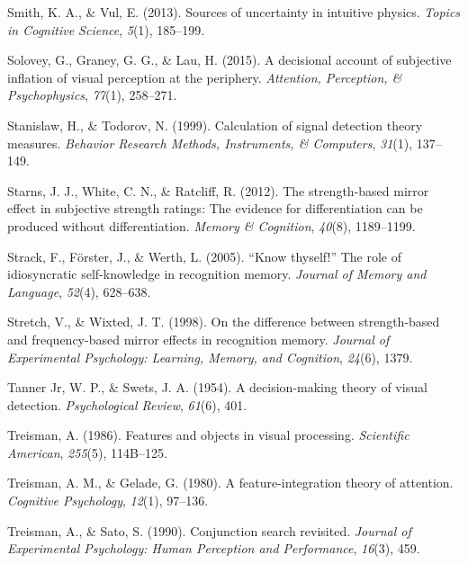 \documentclass[12pt,twoside]{reedthesis}
\begin{document}
\leavevmode\hypertarget{ref-smith2013sources}{}%
Smith, K. A., \& Vul, E. (2013). Sources of uncertainty in intuitive physics. \emph{Topics in Cognitive Science}, \emph{5}(1), 185--199.

\leavevmode\hypertarget{ref-solovey2015decisional}{}%
Solovey, G., Graney, G. G., \& Lau, H. (2015). A decisional account of subjective inflation of visual perception at the periphery. \emph{Attention, Perception, \& Psychophysics}, \emph{77}(1), 258--271.

\leavevmode\hypertarget{ref-stanislaw1999calculation}{}%
Stanislaw, H., \& Todorov, N. (1999). Calculation of signal detection theory measures. \emph{Behavior Research Methods, Instruments, \& Computers}, \emph{31}(1), 137--149.

\leavevmode\hypertarget{ref-starns2012strength}{}%
Starns, J. J., White, C. N., \& Ratcliff, R. (2012). The strength-based mirror effect in subjective strength ratings: The evidence for differentiation can be produced without differentiation. \emph{Memory \& Cognition}, \emph{40}(8), 1189--1199.

\leavevmode\hypertarget{ref-strack2005know}{}%
Strack, F., Förster, J., \& Werth, L. (2005). ``Know thyself!'' The role of idiosyncratic self-knowledge in recognition memory. \emph{Journal of Memory and Language}, \emph{52}(4), 628--638.

\leavevmode\hypertarget{ref-stretch1998difference}{}%
Stretch, V., \& Wixted, J. T. (1998). On the difference between strength-based and frequency-based mirror effects in recognition memory. \emph{Journal of Experimental Psychology: Learning, Memory, and Cognition}, \emph{24}(6), 1379.

\leavevmode\hypertarget{ref-tanner1954decision}{}%
Tanner Jr, W. P., \& Swets, J. A. (1954). A decision-making theory of visual detection. \emph{Psychological Review}, \emph{61}(6), 401.

\leavevmode\hypertarget{ref-treisman1986features}{}%
Treisman, A. (1986). Features and objects in visual processing. \emph{Scientific American}, \emph{255}(5), 114B--125.

\leavevmode\hypertarget{ref-treisman1980feature}{}%
Treisman, A. M., \& Gelade, G. (1980). A feature-integration theory of attention. \emph{Cognitive Psychology}, \emph{12}(1), 97--136.

\leavevmode\hypertarget{ref-treisman1990conjunction}{}%
Treisman, A., \& Sato, S. (1990). Conjunction search revisited. \emph{Journal of Experimental Psychology: Human Perception and Performance}, \emph{16}(3), 459.
\end{document}
